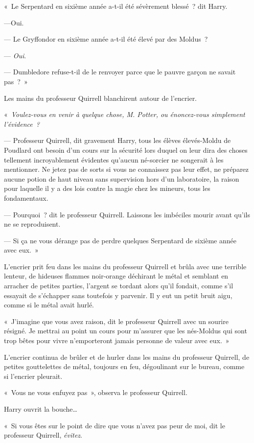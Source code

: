 «~Le Serpentard en sixième année a-t-il été sévèrement blessé~? dit Harry.

---Oui.

--- Le Gryffondor en sixième année a-t-il été élevé par des Moldus~?

--- \emph{Oui}.

--- Dumbledore refuse-t-il de le renvoyer parce que le pauvre garçon ne savait pas~?~»

Les mains du professeur Quirrell blanchirent autour de l'encrier.

«~\emph{Voulez-vous en venir à quelque chose, M. Potter, ou énoncez-vous simplement l'évidence~?}

--- Professeur Quirrell, dit gravement Harry, tous les élèves élevés-Moldu de Poudlard ont besoin d'un cours sur la sécurité lors duquel on leur dira des choses tellement incroyablement évidentes qu'aucun né-sorcier ne songerait à les mentionner.
Ne jetez pas de sorts si vous ne connaissez pas leur effet, ne préparez aucune potion de haut niveau sans supervision hors d'un laboratoire, la raison pour laquelle il y a des lois contre la magie chez les mineurs, tous les fondamentaux.

--- Pourquoi~? dit le professeur Quirrell.
Laissons les imbéciles mourir avant qu'ils ne se reproduisent.

--- Si ça ne vous dérange pas de perdre quelques Serpentard de sixième année avec eux.~»

L'encrier prit feu dans les mains du professeur Quirrell et brûla avec une terrible lenteur, de hideuses flammes noir-orange déchirant le métal et semblant en arracher de petites parties, l'argent se tordant alors qu'il fondait, comme s'il essayait de s'échapper sans toutefois y parvenir.
Il y eut un petit bruit aigu, comme si le métal avait hurlé.

«~J'imagine que vous avez raison, dit le professeur Quirrell avec un sourire résigné.
Je mettrai au point un cours pour m'assurer que les nés-Moldus qui sont trop bêtes pour vivre n'emporteront jamais personne de valeur avec eux.~»

L'encrier continua de brûler et de hurler dans les mains du professeur Quirrell, de petites gouttelettes de métal, toujours en feu, dégoulinant sur le bureau, comme si l'encrier pleurait.

«~Vous ne vous enfuyez pas~», observa le professeur Quirrell.

Harry ouvrit la bouche…

«~Si vous êtes sur le point de dire que vous n'avez pas peur de moi, dit le professeur Quirrell, \emph{évitez}.

